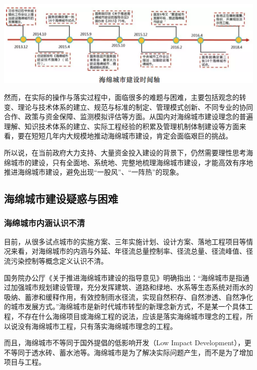 \documentclass[]{book}
\begin{document}
\includegraphics[width=8.33in]{images/hm1}

然而，在实际的操作与落实过程中，面临很多的难题与困难，主要包括观念的转变、理论与技术体系的建立、规范与标准的制定、管理模式创新、不同专业的协同合作、政策与资金保障、监测模拟评估等方面。从国内对海绵城市建设理念的普遍理解、知识技术体系的建立、实际工程经验的积累及管理机制体制建设等方面来看，要在短短几年内大规模地推动海绵城市建设，肯定会面临艰巨的挑战。

所以说，在当前政府大力支持、大量资金投入建设的背景下，仍然需要理性思考海绵城市的建设，只有全面地、系统地、完整地梳理海绵城市建设，才能高效有序地推进海绵城市建设，避免出现``一股风''、``一阵热''的现象。

\subsection{海绵城市建设疑惑与困难}

\subsubsection{海绵城市内涵认识不清}

目前，从很多试点城市的实施方案、三年实施计划、设计方案、落地工程项目等情况来看，对海绵城市的内涵与外延、年径流总量控制率、径流总量、径流峰值、径流污染控制等概念定义认识不清。

国务院办公厅《关于推进海绵城市建设的指导意见》明确指出：``海绵城市是指通过加强城市规划建设管理，充分发挥建筑、道路和绿地、水系等生态系统对雨水的吸纳、蓄渗和缓释作用，有效控制雨水径流，实现自然积存、自然渗透、自然净化的城市发展方式。''海绵城市是新时代城市转型的新理念新方式，不是某一个具体工程，不存在什么海绵项目或海绵工程的说法，应该是落实海绵城市理念的工程，所以说没有海绵城市工程，只有落实海绵城市理念的工程。

而且，海绵城市不等同于国外提倡的低影响开发（Low Impact
Development），更不等同于透水砖、蓄水池等。海绵城市是为了解决实际问题产生，而不是为了增加项目与工程。
\end{document}
